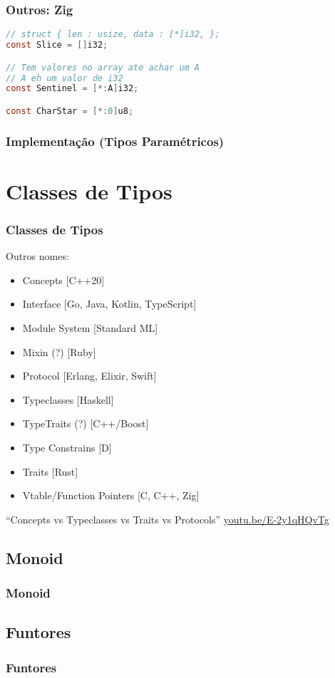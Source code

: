 \documentclass{beamer}
\begin{document}
\begin{frame}[fragile]
    \frametitle{Outros: Zig}
    \begin{lstlisting}[language=C]
// struct { len : usize, data : [*]i32, };
const Slice = []i32;

// Tem valores no array ate achar um A
// A eh um valor de i32
const Sentinel = [*:A]i32;

const CharStar = [*:0]u8;
    \end{lstlisting}
\end{frame}

\begin{frame}
    \frametitle{Implementação (Tipos Paramétricos)}
\end{frame}

\section{Classes de Tipos}
\begin{frame}
    \frametitle{Classes de Tipos}
    Outros nomes:
    \begin{itemize}
        \item Concepts [C++20]
        \item Interface [Go, Java, Kotlin, TypeScript]
        \item Module System [Standard ML]
        \item Mixin (?) [Ruby]
        \item Protocol [Erlang, Elixir, Swift]
        \item Typeclasses [Haskell]
        \item TypeTraits (?) [C++/Boost]
        \item Type Constrains [D]
        \item Traits [Rust]
        \item Vtable/Function Pointers [C, C++, Zig]
    \end{itemize}
    \vfill
    ``Concepts vs Typeclasses vs Traits vs Protocols''
    \url{youtu.be/E-2y1qHQvTg}
\end{frame}

\subsection{Monoid}
\begin{frame}
    \frametitle{Monoid}
\end{frame}

\subsection{Funtores}
\begin{frame}
    \frametitle{Funtores}
\end{frame}
\end{document}
